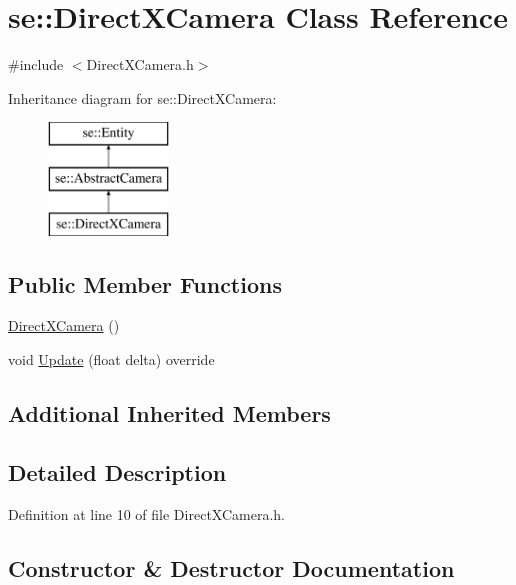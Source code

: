 \hypertarget{classse_1_1_direct_x_camera}{}\section{se\+:\+:Direct\+X\+Camera Class Reference}
\label{classse_1_1_direct_x_camera}


{\ttfamily \#include $<$Direct\+X\+Camera.\+h$>$}

Inheritance diagram for se\+:\+:Direct\+X\+Camera\+:\begin{figure}[H]
\begin{center}
\leavevmode
\includegraphics[height=3.000000cm]{classse_1_1_direct_x_camera}
\end{center}
\end{figure}
\subsection*{Public Member Functions}
\begin{DoxyCompactItemize}
\item 
\mbox{\hyperlink{classse_1_1_direct_x_camera_ab9233ea2d87596b412f34417b515499d}{Direct\+X\+Camera}} ()
\item 
void \mbox{\hyperlink{classse_1_1_direct_x_camera_ae313a5d5a4d2c1b88e5f40285b31b921}{Update}} (float delta) override
\end{DoxyCompactItemize}
\subsection*{Additional Inherited Members}


\subsection{Detailed Description}


Definition at line 10 of file Direct\+X\+Camera.\+h.



\subsection{Constructor \& Destructor Documentation}
\mbox{\label{classse_1_1_direct_x_camera_ab9233ea2d87596b412f34417b515499d}} 
